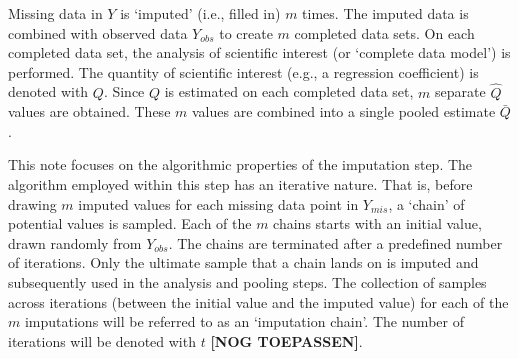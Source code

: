 \documentclass[article]{jss}
\begin{document}
Missing data in $Y$ is `imputed' (i.e., filled in) $m$ times. The imputed data is combined with observed data $Y_{obs}$ to create $m$ completed data sets. On each completed data set, the analysis of scientific interest (or `complete data model') is performed. The quantity of scientific interest (e.g., a regression coefficient) is denoted with $Q$. Since $Q$ is estimated on each completed data set, $m$ separate $\hat{Q}$ values are obtained. These $m$ values are combined into a single pooled estimate $\bar{Q}$.

This note focuses on the algorithmic properties of the imputation step. The algorithm employed within this step has an iterative nature. That is, before drawing $m$ imputed values for each missing data point in $Y_{mis}$, a `chain' of potential values is sampled. Each of the $m$ chains starts with an initial value, drawn randomly from $Y_{obs}$. The chains are terminated after a predefined number of iterations. Only the ultimate sample that a chain lands on is imputed and subsequently used in the analysis and pooling steps. The collection of samples across iterations (between the initial value and the imputed value) for each of the $m$ imputations will be referred to as an `imputation chain'. The number of iterations will be denoted with $t$ \textbf{[NOG TOEPASSEN]}.

\end{document}
